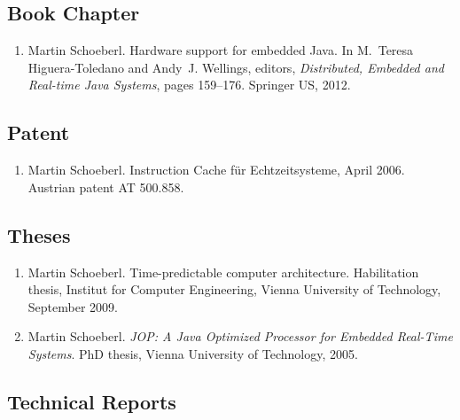 \documentclass[%
    a4paper,
    11pt, %
    headinclude, footexclude,
    notitlepage,
    headsepline,
    pointlessnumbers,
    ]{scrartcl}
\begin{document}
\subsection*{Book Chapter}

\begin{enumerate}

\item Martin Schoeberl.
 Hardware support for embedded {Java}.
 In M.~Teresa Higuera-Toledano and Andy~J. Wellings, editors, {\em
  Distributed, Embedded and Real-time {Java} Systems}, pages 159--176. Springer
  US, 2012.
\end{enumerate}

\subsection*{Patent}

\begin{enumerate}

\item Martin Schoeberl. Instruction Cache f\"ur Echtzeitsysteme,
    April 2006. Austrian patent AT 500.858.
\end{enumerate}


\subsection*{Theses}

\begin{enumerate}

\item Martin Schoeberl.
 Time-predictable computer architecture.
 Habilitation thesis, Institut for Computer Engineering, Vienna
  University of Technology, September 2009.

\item Martin Schoeberl. {\em JOP: A Java Optimized Processor for
    Embedded Real-Time Systems}. PhD thesis, Vienna University of
    Technology, 2005.
\end{enumerate}



  
\subsection*{Technical Reports}
\end{document}
